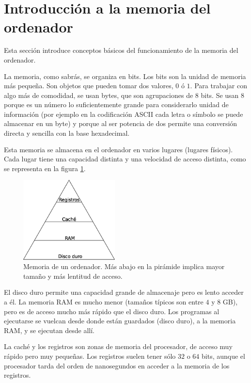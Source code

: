 \documentclass{hxc_cl}
\begin{document}
\section{Introducción a la memoria del ordenador}

Esta sección introduce conceptos básicos del funcionamiento de la memoria del ordenador.

La memoria, como sabrás, se organiza en bits. Los bits son la unidad de memoria más pequeña. Son objetos que pueden tomar dos valores, $0$ ó $1$. Para trabajar con algo más de comodidad, se usan bytes, que son agrupaciones de 8 bits. Se usan $8$ porque es un número lo suficientemente grande para considerarlo unidad de información (por ejemplo en la codificación ASCII cada letra o símbolo se puede almacenar en un byte) y porque al ser potencia de dos permite una conversión directa y sencilla con la base hexadecimal.

Esta memoria se almacena en el ordenador en varios lugares (lugares físicos). Cada lugar tiene una capacidad distinta y una velocidad de acceso distinta, como se representa en la figura \ref{fig:memoria}.

\begin{figure}[H]
\centering
\includegraphics[width=5cm]{memoria}
\caption{\label{fig:memoria}Memoria de un ordenador. Más abajo en la pirámide implica mayor tamaño y más lentitud de acceso.}
\end{figure}

El disco duro permite una capacidad grande de almacenaje pero es lento acceder a él. La memoria RAM es mucho menor (tamaños típicos son entre $4$ y $8$ GB), pero es de acceso mucho más rápido que el disco duro. Los programas al ejecutarse se vuelcan desde donde están guardados (disco duro), a la memoria RAM, y se ejecutan desde allí.

La caché y los registros son zonas de memoria del procesador, de acceso muy rápido pero muy pequeñas. Los registros suelen tener sólo $32$ o $64$ bits, aunque el procesador tarda del orden de nanosegundos en acceder a la memoria de los registros.
\end{document}
